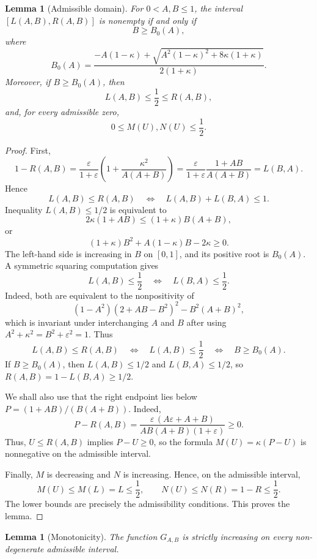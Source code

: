 \documentclass[11pt]{amsart}
\newtheorem{lemma}[theorem]{Lemma}
\theoremstyle{remark}
\newcommand{\eps}{\varepsilon}
\numberwithin{equation}{section}
\begin{document}
\begin{lemma}[Admissible domain]\label{lem:domain}
For $0<A,B\leq 1$, the interval $[L(A,B),R(A,B)]$ is nonempty if and only if
\[
        B\geq B_0(A),
\]
where
\[
        B_0(A)=
        \frac{-A(1-\kappa)+\sqrt{A^2(1-\kappa)^2+8\kappa(1+\kappa)}}{2(1+\kappa)}.
\]
Moreover, if $B\geq B_0(A)$, then
\[
        L(A,B)\leq \frac12\leq R(A,B),
\]
and, for every admissible zero,
\[
        0\leq M(U),N(U)\leq \frac12.
\]
\end{lemma}

\begin{proof}
First,
\[
        1-R(A,B)
        =\frac{\eps}{1+
        \eps}\left(1+\frac{\kappa^2}{A(A+B)}\right)
        =\frac{\eps}{1+
        \eps}\frac{1+AB}{A(A+B)}
        =L(B,A).
\]
Hence
\[
        L(A,B)\leq R(A,B)
        \quad\Longleftrightarrow\quad
        L(A,B)+L(B,A)\leq 1.
\]
 Inequality $L(A,B)\leq 1/2$ is equivalent to
\[
        2\kappa(1+AB)\leq (1+
        \kappa)B(A+B),
\]
or
\[
        (1+
        \kappa)B^2+A(1-
        \kappa)B-2\kappa\geq 0.
\]
The left-hand side is increasing in $B$ on $[0,1]$, and its positive root is $B_0(A)$.
A symmetric squaring computation gives
\[
        L(A,B)\leq \frac12
        \quad\Longleftrightarrow\quad
        L(B,A)\leq \frac12.
\]
Indeed, both are equivalent to the nonpositivity of
\[
        (1-A^2)(2+AB-B^2)^2-B^2(A+B)^2,
\]
which is invariant under interchanging $A$ and $B$ after using $A^2+
        \kappa^2=B^2+\eps^2=1$.
Thus
\[
        L(A,B)\leq R(A,B)
        \quad\Longleftrightarrow\quad
        L(A,B)\leq \frac12
        \quad\Longleftrightarrow\quad
        B\geq B_0(A).
\]
If $B\geq B_0(A)$, then $L(A,B)\leq 1/2$ and $L(B,A)\leq 1/2$, so $R(A,B)=1-L(B,A)\geq 1/2$.

We shall also use that the right endpoint lies below $P=(1+AB)/(B(A+B))$. Indeed,
\[
        P-R(A,B)=
        \frac{\eps\,(A\eps+A+B)}{AB(A+B)(1+\eps)}\geq 0.
\]
Thus, $U\leq R(A,B)$ implies $P-U\geq0$, so the formula $M(U)=\kappa(P-U)$ is nonnegative on the admissible interval.

Finally, $M$ is decreasing and $N$ is increasing. Hence, on the admissible interval,
\[
        M(U)\leq M(L)=L\leq \frac12,
        \qquad
        N(U)\leq N(R)=1-R\leq \frac12.
\]
The lower bounds are precisely the admissibility conditions. This proves the lemma.
\end{proof}

\begin{lemma}[Monotonicity]\label{lem:monotone}
The function $G_{A,B}$ is strictly increasing on every non-degenerate admissible interval.
\end{lemma}
\end{document}
